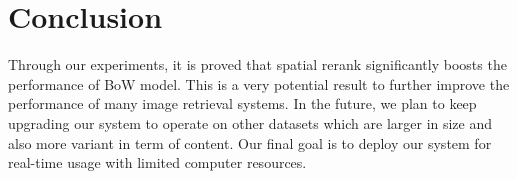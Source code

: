 \section{Conclusion}

Through our experiments, it is proved that spatial rerank significantly boosts the performance of BoW model. This is a very potential result to further improve the performance of many image retrieval systems. In the future, we plan to keep upgrading our system to operate on other datasets which are larger in size and also more variant in term of content. Our final goal is to deploy our system for real-time usage with limited computer resources.
